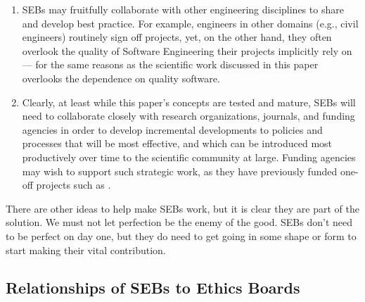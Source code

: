 \documentclass[10pt,a4paper]{article}
\begin{document}
\begin{enumerate}
\item
SEBs may fruitfully collaborate with other engineering disciplines to share and develop best practice. For example, engineers in other domains (e.g., civil engineers) routinely sign off projects, yet, on the other hand, they often overlook the quality of Software Engineering their projects implicitly rely on  --- for the same reasons as the scientific work discussed in this paper overlooks the dependence on quality software.

\item
Clearly, at least while this paper's concepts are tested and mature, SEBs will need to collaborate closely with research organizations, journals, and funding agencies in order to develop incremental developments to policies and processes that will be most effective, and which can be introduced most productively over time to the scientific community at large. Funding agencies may wish to support such strategic work, as they have previously funded one-off projects such as \cite{cosmos}.
\end{enumerate}
 
There are other ideas to help make SEBs work, but it is clear they are part of the solution. We must not let perfection be the enemy of the good. SEBs don't need to be perfect on day one, but they do need to get going in some shape or form to start making their vital contribution.

\subsection{Relationships of SEBs to Ethics Boards}
\end{document}
